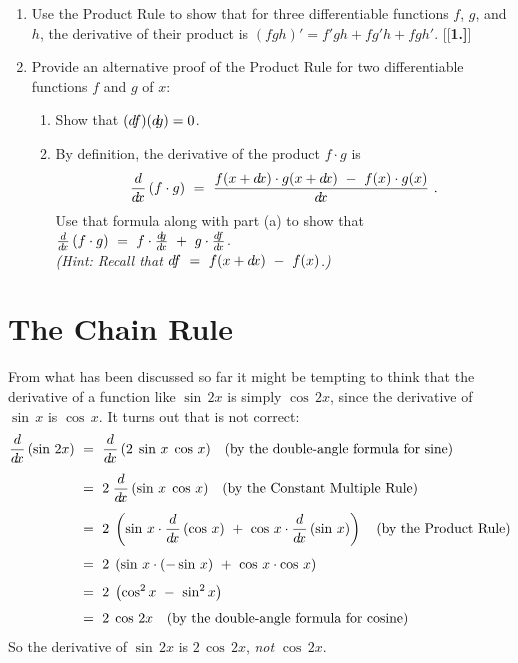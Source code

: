 {\begin{enumerate}[\bfseries 1.]
\begin{multicols}{2}
\end{multicols}
[{[\bfseries 1.]}]
 \item Use the Product Rule to show that for three differentiable functions $f$,
  $g$, and $h$, the derivative of their product is
  $(fgh)' = f'gh + fg'h + fgh'$.
[{[\bfseries 1.]}]
 \item Provide an alternative proof of the Product Rule for two differentiable
 functions $f$ and $g$ of $x$:
 \begin{enumerate}[\bfseries (a)]
  \item Show that $(d\negmedspace f)(d\negmedspace g) = 0$.
  \item By definition, the derivative of the product $f \cdot g$ is
   \begin{displaymath}
    \frac{d}{d\!x}\,(f \cdot g) ~=~ \frac{f(x+d\!x) \cdot g(x+d\!x) ~-~ f(x) \cdot g(x)}{d\!x} ~.
   \end{displaymath}
   Use that formula along with part (a) to show that
   $\frac{d}{d\!x}\,(f \cdot g) ~=~ f \cdot \frac{d\negmedspace g}{d\!x} ~+~ g \cdot \frac{d\negmedspace f}{d\!x}$.\\
   \emph{(Hint: Recall that $d\negmedspace f ~=~ f(x+d\!x) ~-~ f(x)$.)}
 \end{enumerate}
\end{enumerate}}
\newpage
\section{The Chain Rule}
From what has been discussed so far it might be tempting to think that the
derivative of a function like $\sin\,2x$ is simply
$\cos\,2x$, since the derivative of $\sin\,x$ is $\cos\,x$.
It turns out that is not correct:
\begin{align*}
 \frac{d}{d\!x}\,(\sin\,2x) ~&=~ \frac{d}{d\!x}\,(2\;\sin\,x\;\cos\,x) \quad\text{(by the double-angle formula for sine)}\\[4pt]
 &=~ 2\;\frac{d}{d\!x}\,(\sin\,x\;\cos\,x) \quad\text{(by the Constant Multiple Rule)}\\[4pt]
 &=~ 2\;\left(\sin\,x \cdot \frac{d}{d\!x}\,(\cos\,x) ~+~ \cos\,x \cdot \frac{d}{d\!x}\,(\sin\,x)\right)
     \quad\text{(by the Product Rule)}\\[4pt]
 &=~ 2\;\left(\sin\,x \cdot (-\sin\,x) ~+~ \cos\,x \cdot \cos\,x\right)\\[4pt]
 &=~ 2\;\left(\cos^2 x ~-~ \sin^2 x\right)\\[4pt]
 &=~ 2\;\cos\,2x \quad\text{(by the double-angle formula for cosine)}
\end{align*}
So the derivative of $\sin\,2x$ is $2\,\cos\,2x$, \emph{not} $\cos\,2x$.

